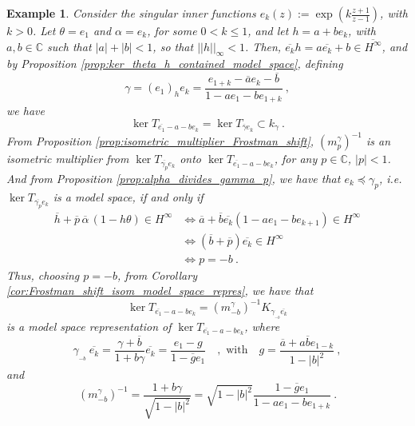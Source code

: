 \documentclass{article}
\numberwithin{equation}{section}
\theoremstyle{plain}
\newtheorem{ex}[thm]{Example}
\newcommand{\Hinf}{\ensuremath{H^\infty}}
\newcommand{\CC}{\ensuremath{\mathbb{C}}}
\newcommand{\ol}[1]{\ensuremath{\overline{#1}}}
\begin{document}
\begin{ex}
Consider the singular inner functions $e_k(z) := \exp \left( k \frac{z+1}{z-1} \right)$, with $k > 0$.
Let $\theta = e_1$ and $\alpha = e_k$, for some $0 < k \leq 1$, and let $h=a+b e_k$, with $a,b\in\CC$ such that $|a|+|b|<1$, so that $||h||_\infty <1$.
Then, $\ol{e_k} h = a \ol{e_k} + b \in \ol\Hinf$, and by Proposition \ref{prop:ker_theta_h_contained_model_space}, defining
\begin{equation}
\gamma = (e_1)_h e_k = \frac{e_{1+k} - \ol a e_k - \ol b}{1 - a e_1 - b e_{1+k}} \ ,
\end{equation}
we have
\begin{equation}
\ker T_{\ol{e_1} - a - b e_k} = \ker T_{\ol\gamma e_k} \subset k_\gamma \ .
\end{equation}
From Proposition \ref{prop:isometric_multiplier_Frostman_shift}, $\left( m_{p}^\gamma \right)^{-1}$ is an isometric multiplier from $\ker T_{\ol{\gamma_p} e_k}$ onto $\ker T_{\ol{e_1} - a - b e_k}$, for any $p\in\CC$, $|p|<1$.
And from Proposition \ref{prop:alpha_divides_gamma_p}, we have that $e_k \preceq \gamma_p$, i.e. $\ker T_{\ol{\gamma_p} e_k}$ is a model space, if and only if
\begin{align}
\ol h + \ol p\, \ol\alpha \, (1 - h\theta) \in \Hinf 
& \iff \ol a + \ol b \ol{e_k} (1 - a e_1 - b e_{k+1}) \in\Hinf \\
& \iff (\ol b + \ol p) \ol{e_k} \in \Hinf \\
& \iff p = -b \ .
\end{align}
Thus, choosing $p=-b$, from Corollary \ref{cor:Frostman_shift_isom_model_space_repres}, we have that
\begin{equation}
\ker T_{\ol{e_1} - a - b e_k}
= \left( m_{-b}^\gamma \right)^{-1} K_{\gamma_{{}_{-b}} \ol{e_k}}
\end{equation}
is a model space representation of $\ker T_{\ol{e_1} - a - b e_k}$, where
\begin{equation}
\gamma_{{}_{-b}}\ \ol{e_k} = \frac{\gamma + \ol b}{1 + b\gamma} \ol{e_k} = \frac{e_1 - g}{1 - \ol g e_1}
\quad , \text{ with} \quad
g = \frac{\ol a + a \ol b e_{1-k}}{1 - |b|^2} \ ,
\end{equation}
and
\begin{equation}
\left( m_{-b}^\gamma \right)^{-1} = \frac{1+b\gamma}{\sqrt{1-|b|^2}} = \sqrt{1 - |b|^2} \frac{1 - \ol g e_1}{1 - a e_1 - b e_{1+k}} \ .
\end{equation}
\end{ex}
\end{document}
